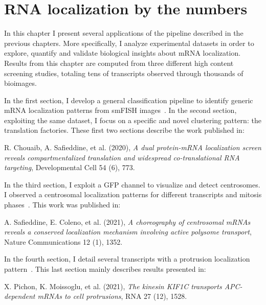 
\graphicspath{{./figures/chapter5/}}

\chapter{RNA localization by the numbers}
\label{ch:chapter5}

\minitoc
\newpage

In this chapter I present several applications of the pipeline described in the previous chapters.
More specifically, I analyze experimental datasets in order to explore, quantify and validate biological insights about \ac{mRNA} localization.
Results from this chapter are computed from three different high content screening studies, totaling tens of transcripts observed through thousands of bioimages.

In the first section, I develop a general classification pipeline to identify generic \ac{mRNA} localization patterns from \ac{smFISH} images~\cite{CHOUAIB_2020}.
In the second section, exploiting the same dataset, I focus on a specific and novel clustering pattern: the translation factories.
These first two sections describe the work published in:

\begin{center}
	\color{green}
	R. Chouaib, A. Safieddine, et al. (2020), \textit{A dual protein-mRNA localization screen reveals compartmentalized translation and widespread co-translational RNA targeting}, Developmental Cell 54 (6), 773.
\end{center}

In the third section, I exploit a \ac{GFP} channel to visualize and detect centrosomes.
I observed a centrosomal localization patterns for different transcripts and mitosis phases~\cite{safieddine_choreography_2021}.
This work was published in:

\begin{center}
	\color{green}
	A. Safieddine, E. Coleno, et al. (2021), \textit{A choreography of centrosomal mRNAs reveals a conserved localization mechanism involving active polysome transport}, Nature Communications 12 (1), 1352.
\end{center}

In the fourth section, I detail several transcripts with a protrusion localization pattern~\cite{pichon_kinesin_2021}.
This last section mainly describes results presented in:

\begin{center}
	\color{green}
	X. Pichon, K. Moissoglu, et al. (2021), \textit{The kinesin KIF1C transports APC-dependent mRNAs to cell protrusions}, RNA 27 (12), 1528.
\end{center}


